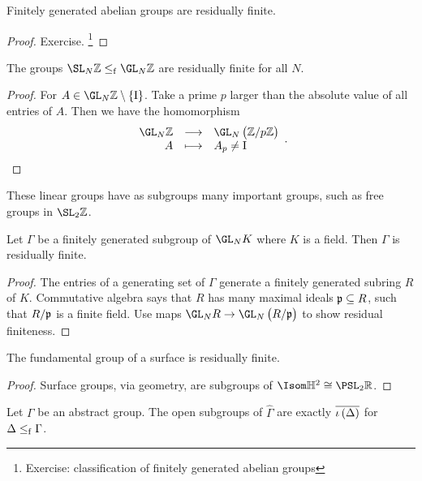 \begin{proposition}
Finitely generated abelian groups are residually finite.
\end{proposition}

\begin{proof}
Exercise. \footnote{Exercise: classification of finitely generated abelian groups}
\end{proof}

\begin{proposition}
The groups $ \SL_N \ZZ \le_\f \GL_N \ZZ $ are residually finite for all $ N $.
\end{proposition}

\begin{proof}
For $ A \in \GL_N \ZZ \setminus \cbr{\I} $. Take a prime $ p $ larger than the absolute value of all entries of $ A $. Then we have the homomorphism
$$ \function{\GL_N \ZZ}{\GL_N \br{\ZZ / p\ZZ}}{A}{A_p \ne \I}. $$
\end{proof}

These linear groups have as subgroups many important groups, such as free groups in $ \SL_2 \ZZ $.

\begin{theorem}
Let $ \Gamma $ be a finitely generated subgroup of $ \GL_N K $ where $ K $ is a field. Then $ \Gamma $ is residually finite.
\end{theorem}

\begin{proof}
The entries of a generating set of $ \Gamma $ generate a finitely generated subring $ R $ of $ K $. Commutative algebra says that $ R $ has many maximal ideals $ \mathfrak{p} \subseteq R $, such that $ R / \mathfrak{p} $ is a finite field. Use maps $ \GL_N R \to \GL_N \br{R / \ppp} $ to show residual finiteness.
\end{proof}

\begin{proposition}
The fundamental group of a surface is residually finite.
\end{proposition}

\begin{proof}
Surface groups, via geometry, are subgroups of $ \Isom \HH^2 \cong \PSL_2 \RR $.
\end{proof}

\pagebreak

\begin{lemma}
Let $ \Gamma $ be an abstract group. The open subgroups of $ \widehat{\Gamma} $ are exactly $ \overline{\iota\br{\Delta}} $ for $ \Delta \le_{\mathrm{f}} \Gamma $.
\end{lemma}

